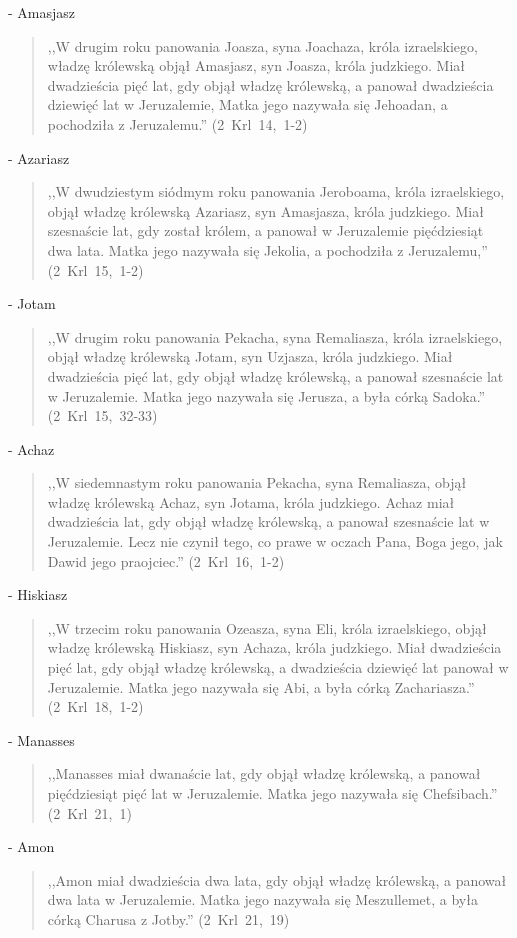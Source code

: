 \documentclass[10pt,a4paper,oneside]{article}
\begin{document}
- Amasjasz
\begin{quote}
,,W drugim roku panowania Joasza, syna Joachaza, króla izraelskiego, władzę królewską objął Amasjasz, syn Joasza, króla judzkiego. Miał dwadzieścia pięć lat, gdy objął władzę królewską, a panował dwadzieścia dziewięć lat w Jeruzalemie, Matka jego nazywała się Jehoadan, a pochodziła z Jeruzalemu.'' \mbox{(2 Krl 14, 1-2)}
\end{quote}
- Azariasz
\begin{quote}
,,W dwudziestym siódmym roku panowania Jeroboama, króla izraelskiego, objął władzę królewską Azariasz, syn Amasjasza, króla judzkiego. Miał szesnaście lat, gdy został królem, a panował w Jeruzalemie pięćdziesiąt dwa lata. Matka jego nazywała się Jekolia, a pochodziła z Jeruzalemu,'' \mbox{(2 Krl 15, 1-2)}
\end{quote}
- Jotam
\begin{quote}
,,W drugim roku panowania Pekacha, syna Remaliasza, króla izraelskiego, objął władzę królewską Jotam, syn Uzjasza, króla judzkiego. Miał dwadzieścia pięć lat, gdy objął władzę królewską, a panował szesnaście lat w Jeruzalemie. Matka jego nazywała się Jerusza, a była córką Sadoka.'' \mbox{(2 Krl 15, 32-33)}
\end{quote}
- Achaz
\begin{quote}
,,W siedemnastym roku panowania Pekacha, syna Remaliasza, objął władzę królewską Achaz, syn Jotama, króla judzkiego. Achaz miał dwadzieścia lat, gdy objął władzę królewską, a panował szesnaście lat w Jeruzalemie. Lecz nie czynił tego, co prawe w oczach Pana, Boga jego, jak Dawid jego praojciec.'' \mbox{(2 Krl 16, 1-2)}
\end{quote}
- Hiskiasz
\begin{quote}
,,W trzecim roku panowania Ozeasza, syna Eli, króla izraelskiego, objął władzę królewską Hiskiasz, syn Achaza, króla judzkiego. Miał dwadzieścia pięć lat, gdy objął władzę królewską, a dwadzieścia dziewięć lat panował w Jeruzalemie. Matka jego nazywała się Abi, a była córką Zachariasza.'' \mbox{(2 Krl 18, 1-2)}
\end{quote}
- Manasses
\begin{quote}
,,Manasses miał dwanaście lat, gdy objął władzę królewską, a panował pięćdziesiąt pięć lat w Jeruzalemie. Matka jego nazywała się Chefsibach.'' \mbox{(2 Krl 21, 1)}
\end{quote}
- Amon
\begin{quote}
,,Amon miał dwadzieścia dwa lata, gdy objął władzę królewską, a panował dwa lata w Jeruzalemie. Matka jego nazywała się Meszullemet, a była córką Charusa z Jotby.'' \mbox{(2 Krl 21, 19)}
\end{quote}
\end{document}
